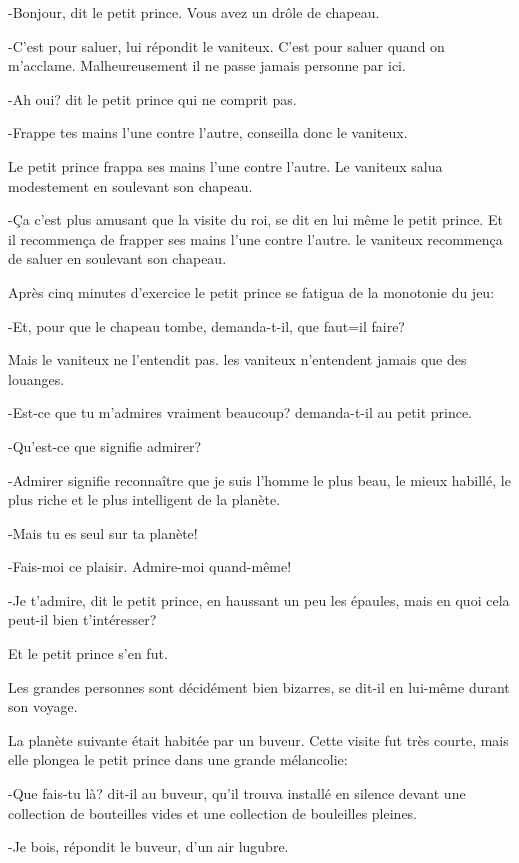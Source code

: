 \documentclass{report}
\begin{document}
-Bonjour, dit le petit prince. Vous avez un drôle de chapeau.

-C'est pour saluer, lui répondit le vaniteux. C'est pour saluer quand on m'acclame. Malheureusement il ne passe jamais personne par ici.

-Ah oui? dit le petit prince qui ne comprit pas.

-Frappe tes mains l'une contre l'autre, conseilla donc le vaniteux.

Le petit prince frappa ses mains l'une contre l'autre. Le vaniteux salua modestement en soulevant son chapeau.

-Ça c'est plus amusant que la visite du roi, se dit en lui même le petit prince. Et il recommença de frapper ses mains l'une contre l'autre. le vaniteux recommença de saluer en soulevant son chapeau.

Après cinq minutes d'exercice le petit prince se fatigua de la monotonie du jeu:

-Et, pour que le chapeau tombe, demanda-t-il, que faut=il faire?

Mais le vaniteux ne l'entendit pas. les vaniteux n'entendent jamais que des louanges.

-Est-ce que tu m'admires vraiment beaucoup? demanda-t-il au petit prince.

-Qu'est-ce que signifie admirer?

-Admirer signifie reconnaître que je suis l'homme le plus beau, le mieux habillé, le plus riche et le plus intelligent de la planète.

-Mais tu es seul sur ta planète!

-Fais-moi ce plaisir. Admire-moi quand-même!

-Je t'admire, dit le petit prince, en haussant un peu les épaules, mais en quoi cela peut-il bien t'intéresser?

Et le petit prince s'en fut.

Les grandes personnes sont décidément bien bizarres, se dit-il en lui-même durant son voyage.

\parachapter{} %
La planète suivante était habitée par un buveur. Cette visite fut très courte, mais elle plongea le petit prince dans une grande mélancolie:

-Que fais-tu là? dit-il au buveur, qu'il trouva installé en silence devant une collection de bouteilles vides et une collection de bouleilles pleines.


-Je bois, répondit le buveur, d'un air lugubre.
\end{document}
